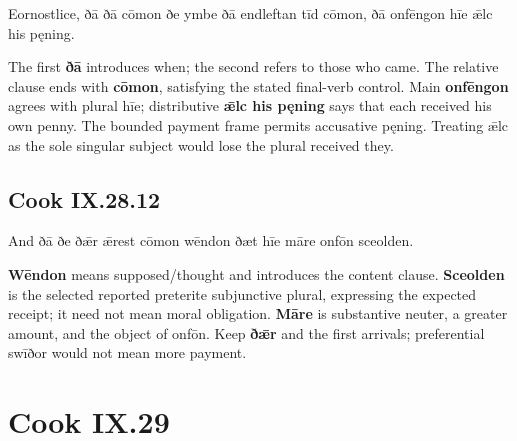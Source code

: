\par\begin{minipage}{\linewidth}\raggedright
Eornostlice, ðā ðā cōmon ðe ymbe ðā endleftan tīd cōmon, ðā onfēngon hīe ǣlc his pęning.

The first \textbf{ðā} introduces when; the second refers to those who came. The relative clause ends with \textbf{cōmon}, satisfying the stated final-verb control. Main \textbf{onfēngon} agrees with plural hīe; distributive \textbf{ǣlc his pęning} says that each received his own penny. The bounded payment frame permits accusative pęning. Treating ǣlc as the sole singular subject would lose the plural received they.

\end{minipage}\par\addvspace{4pt}

\subsection*{Cook IX.28.12}

\par\begin{minipage}{\linewidth}\raggedright
And ðā ðe ðǣr ǣrest cōmon wēndon ðæt hīe māre onfōn sceolden.

\textbf{Wēndon} means supposed/\allowbreak{}thought and introduces the content clause. \textbf{Sceolden} is the selected reported preterite subjunctive plural, expressing the expected receipt; it need not mean moral obligation. \textbf{Māre} is substantive neuter, a greater amount, and the object of onfōn. Keep \textbf{ðǣr} and the first arrivals; preferential swīðor would not mean more payment.

\end{minipage}\par\addvspace{4pt}

\section*{Cook IX.29}

